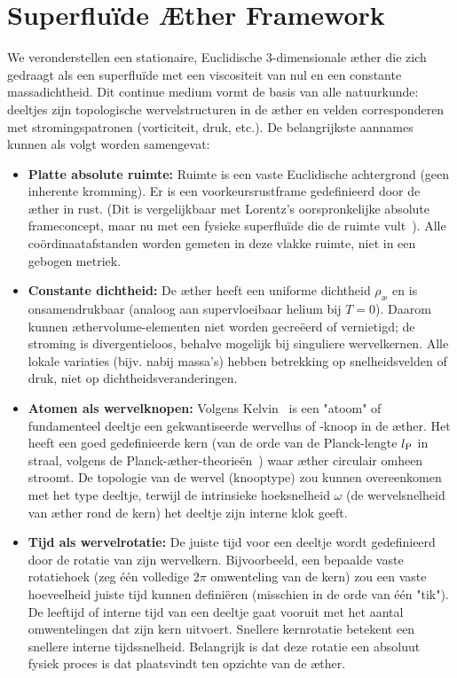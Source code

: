 \section{Superfluïde Æther Framework}

We veronderstellen een stationaire, Euclidische 3-dimensionale æther die zich gedraagt als een superfluïde met een viscositeit van nul en een constante massadichtheid. Dit continue medium vormt de basis van alle natuurkunde: deeltjes zijn topologische wervelstructuren in de æther en velden corresponderen met stromingspatronen (vorticiteit, druk, etc.). De belangrijkste aannames kunnen als volgt worden samengevat:

\begin{itemize}
    \item \textbf{Platte absolute ruimte:} Ruimte is een vaste Euclidische achtergrond (geen inherente kromming). Er is een voorkeursrustframe gedefinieerd door de æther in rust. (Dit is vergelijkbaar met Lorentz's oorspronkelijke absolute frameconcept, maar nu met een fysieke superfluïde die de ruimte vult~\cite{Winterberg2002-PlanckAether}). Alle coördinaatafstanden worden gemeten in deze vlakke ruimte, niet in een gebogen metriek.

    \item \textbf{Constante dichtheid:} De æther heeft een uniforme dichtheid $\rho_{\text{\ae}}$ en is onsamendrukbaar (analoog aan supervloeibaar helium bij $T=0$). Daarom kunnen æthervolume-elementen niet worden gecreëerd of vernietigd; de stroming is divergentieloos, behalve mogelijk bij singuliere wervelkernen. Alle lokale variaties (bijv. nabij massa's) hebben betrekking op snelheidsvelden of druk, niet op dichtheidsveranderingen.

    \item \textbf{Atomen als wervelknopen:} Volgens Kelvin~\cite{Kelvin1867-vortex} is een "atoom" of fundamenteel deeltje een gekwantiseerde wervellus of -knoop in de æther. Het heeft een goed gedefinieerde kern (van de orde van de Planck-lengte $l_{\textrm P}$ in straal, volgens de Planck-æther-theorieën~\cite{Winterberg2002-PlanckAether}) waar æther circulair omheen stroomt. De topologie van de wervel (knooptype) zou kunnen overeenkomen met het type deeltje, terwijl de intrinsieke hoeksnelheid $\omega$ (de wervelsnelheid van æther rond de kern) het deeltje zijn interne klok geeft.

    \item \textbf{Tijd als wervelrotatie:} De juiste tijd voor een deeltje wordt gedefinieerd door de rotatie van zijn wervelkern. Bijvoorbeeld, een bepaalde vaste rotatiehoek (zeg één volledige $2\pi$ omwenteling van de kern) zou een vaste hoeveelheid juiste tijd kunnen definiëren (misschien in de orde van één "tik"). De leeftijd of interne tijd van een deeltje gaat vooruit met het aantal omwentelingen dat zijn kern uitvoert. Snellere kernrotatie betekent een snellere interne tijdssnelheid. Belangrijk is dat deze rotatie een absoluut fysiek proces is dat plaatsvindt ten opzichte van de æther.


\end{itemize}
